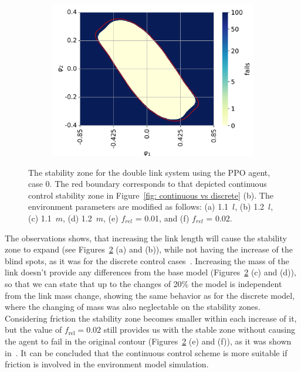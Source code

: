 \begin{figure}[h!]
\begin{subfigure}[t]{0.32\textwidth}
         \includegraphics[width=\textwidth]{Figures/DP_friction_0.02.png}
         \label{fig: DP friction 0.02}
         \caption{}
     \end{subfigure}

     \caption{The stability zone for the double link system using the PPO agent, case 0. The red boundary corresponds to that depicted continuous control stability zone in Figure~\ref{fig: continuous vs discrete} (b). The environment parameters are modified as follows: (a) 1.1~$l$, (b) 1.2~$l$, (c) 1.1~$m$, (d) 1.2~$m$, (e) $f_{rel}$ = 0.01, and (f) $f_{rel}$ = 0.02.}
     \label{fig: agent impact on different environments}
 \end{figure}

The observations shows, that increasing the link length will cause the stability zone to expand (see Figures~\ref{fig: agent impact on different environments} (a) and (b)), while not having the increase of the blind spots, as it was for the discrete control cases~\cite{manzl2023relrl}. Increasing the mass of the link doesn't provide any differences from the base model (Figures~\ref{fig: agent impact on different environments} (c) and (d)), so that we can state that up to the changes of 20\% the model is independent from the link mass change, showing the same behavior as for the discrete model, where the changing of mass was also neglectable on the stability zones.
Considering friction the stability zone becomes smaller within each increase of it, but the value of \( f_{\text{rel}} = 0.02 \) still provides us with the stable zone without causing the agent to fail in the original contour (Figures~\ref{fig: agent impact on different environments} (e) and (f)), as it was shown in~\cite{manzl2023relrl}. It can be concluded that the continuous control scheme is more suitable if friction is involved in the environment model simulation.

